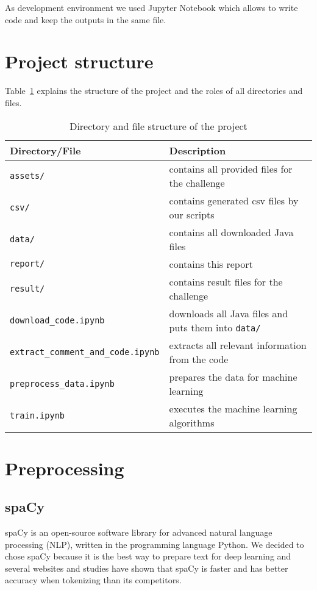 \documentclass[runningheads]{llncs}
\begin{document}
As development environment we used Jupyter Notebook \cite{ref_jupyter} which allows to write code and keep the outputs in the same file.


\section{Project structure}\label{chapter:structure}
Table~\ref{tab:structure} explains the structure of the project and the roles of all directories and files.

\begin{table}[]
\centering
\begin{tabular}{|l|l|}
\hline
\rowcolor[HTML]{C0C0C0} 
\textbf{Directory/File} & \textbf{Description} \\ \hline
\texttt{assets/} & contains all provided files for the challenge \\ \hline
\texttt{csv/} & contains generated csv files by our scripts \\ \hline
\texttt{data/} & contains all downloaded Java files \\ \hline
\texttt{report/} & contains this report \\ \hline
\texttt{result/} & contains result files for the challenge \\ \hline
\texttt{download\_code.ipynb} & downloads all Java files and puts them into \texttt{data/} \\ \hline
\texttt{extract\_comment\_and\_code.ipynb} & extracts all relevant information from the code \\ \hline
\texttt{preprocess\_data.ipynb} & prepares the data for machine learning \\ \hline
\texttt{train.ipynb} & executes the machine learning algorithms \\ \hline
\end{tabular}
\caption{Directory and file structure of the project}
\label{tab:structure}
\end{table}


\section{Preprocessing}\label{chapter:preprocessing}

\subsection{spaCy}
spaCy \cite{ref_spacy} is an open-source software library for advanced natural language processing (NLP), written in the programming language Python.
We decided to chose spaCy because it is the best way to prepare text for deep learning \cite{ref_spacy_facts} and several websites and studies \cite{ref_choi} have shown that spaCy is faster and has better accuracy when tokenizing than its competitors.
\end{document}
